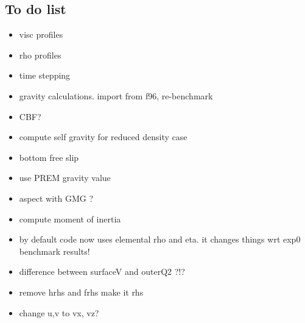 \documentclass[a4paper,12pt]{article}
\begin{document}
\subsection{To do list}
\begin{itemize}
\item visc profiles
\item rho profiles
\item time stepping
\item gravity calculations. import from f96, re-benchmark
\item CBF? 
\item compute self gravity for reduced density case 
\item bottom free slip 
\item use PREM gravity value
\item aspect with GMG ?
\item compute moment of inertia
\item by default code now uses elemental rho and eta. 
it changes things wrt exp0 benchmark results!
\item difference between surfaceV and outerQ2 ?!?
\item remove hrhs and frhs make it rhs
\item change u,v to vx, vz?
\end{itemize}



\printbibliography
\end{document}
